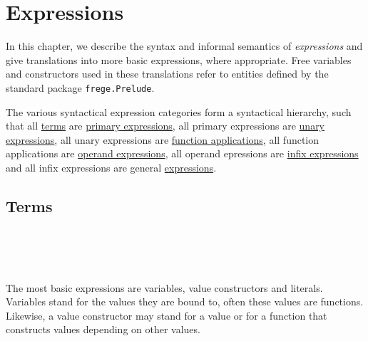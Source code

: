 

\chapter{Expressions} \label{expressions} 

In this chapter, we describe the syntax and informal semantics of \frege{} \emph{expressions} and give translations into more basic expressions, where appropriate.
Free variables and constructors used in these translations refer to entities defined by the standard package \texttt{frege.Prelude}.

The various syntactical expression categories form a syntactical hierarchy, such that 
all \hyperref[termexp]{terms} are \hyperref[primexp]{primary expressions}, 
all primary expressions are \hyperref[unaryexp]{unary expressions},
all unary expressions are \hyperref[funapp]{function applications},
all function applications are \hyperref[topex]{operand expressions},
all operand epressions are \hyperref[binex]{infix expressions}
and all infix expressions are general \hyperref[annex]{expressions}.

\section{Terms}  \label{termexp}

\begin{flushleft}
  
  \alt{}   
  \alt{}   \sym{\{}  \sym{\}} 
  \alt{} 
  \alt{} \regex{\_} 
  \alt{} \sym{(}  \sym{)}
  \alt{} \sym{(}  \sym{)}
  \alt{} 
  \alt{} \sym{(} \sym{)} 
  \alt{}  
  \alt{}   \\
 \\
  \\
\end{flushleft}

The most basic expressions are variables, value constructors and literals.
Variables stand for the values they are bound to, often these values are functions.
Likewise, a value constructor may stand for a value or for a function that constructs values depending on other values.

